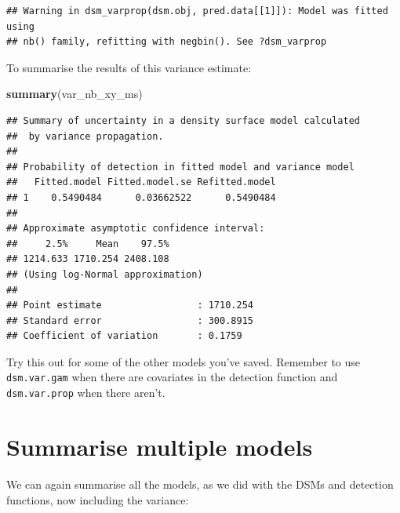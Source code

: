 \documentclass[]{book}
\newenvironment{Shaded}{\begin{snugshade}}{\end{snugshade}}
\newcommand{\KeywordTok}[1]{\textcolor[rgb]{0.13,0.29,0.53}{\textbf{#1}}}
\newcommand{\NormalTok}[1]{#1}
\theoremstyle{definition}
\theoremstyle{definition}
\theoremstyle{remark}
\begin{document}
\begin{verbatim}
## Warning in dsm_varprop(dsm.obj, pred.data[[1]]): Model was fitted using
## nb() family, refitting with negbin(). See ?dsm_varprop
\end{verbatim}

To summarise the results of this variance estimate:

\begin{Shaded}
\begin{Highlighting}[]
\KeywordTok{summary}\NormalTok{(var_nb_xy_ms)}
\end{Highlighting}
\end{Shaded}

\begin{verbatim}
## Summary of uncertainty in a density surface model calculated
##  by variance propagation.
## 
## Probability of detection in fitted model and variance model
##   Fitted.model Fitted.model.se Refitted.model
## 1    0.5490484      0.03662522      0.5490484
## 
## Approximate asymptotic confidence interval:
##     2.5%     Mean    97.5% 
## 1214.633 1710.254 2408.108 
## (Using log-Normal approximation)
## 
## Point estimate                 : 1710.254 
## Standard error                 : 300.8915 
## Coefficient of variation       : 0.1759
\end{verbatim}

Try this out for some of the other models you've saved. Remember to use
\texttt{dsm.var.gam} when there are covariates in the detection function
and \texttt{dsm.var.prop} when there aren't.

\section{Summarise multiple models}\label{summarise-multiple-models}

We can again summarise all the models, as we did with the DSMs and
detection functions, now including the variance:
\end{document}
